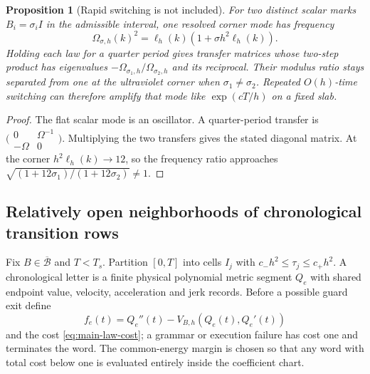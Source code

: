 \documentclass[11pt]{article}
\newtheorem{proposition}[proposition]{Proposition}
\theoremstyle{definition}
\theoremstyle{remark}
\begin{document}
\begin{proposition}[Rapid switching is not included]
\label{prop:supp-law-switching}
For two distinct scalar marks $B_i=\sigma_iI$ in the admissible interval, one
resolved corner mode has frequency
\begin{equation}
 \Omega_{\sigma,h}(k)^2=\ell_h(k)(1+\sigma h^2\ell_h(k)).
 \label{eq:supp-law-dispersion}
\end{equation}
Holding each law for a quarter period gives transfer matrices whose two-step
product has eigenvalues
$-\Omega_{\sigma_1,h}/\Omega_{\sigma_2,h}$ and its reciprocal.  Their modulus
ratio stays separated from one at the ultraviolet corner when
$\sigma_1\ne\sigma_2$.  Repeated $O(h)$-time switching can therefore amplify
that mode like $\exp(cT/h)$ on a fixed slab.
\end{proposition}
\begin{proof}
The flat scalar mode is an oscillator.  A quarter-period transfer is
$\bigl(\begin{smallmatrix}0&\Omega^{-1}\\-\Omega&0\end{smallmatrix}\bigr)$.
Multiplying the two transfers gives the stated diagonal matrix.  At the
corner $h^2\ell_h(k)\to12$, so the frequency ratio approaches
$\sqrt{(1+12\sigma_1)/(1+12\sigma_2)}\ne1$.
\end{proof}

\subsection{Relatively open neighborhoods of chronological transition rows}

Fix $B\in\overline{\mathcal B}$ and $T<T_s$.  Partition $[0,T]$ into cells
$I_j$ with $c_-h^2\le\tau_j\le c_+h^2$.  A chronological letter is a finite
physical polynomial metric segment $Q_e$ with shared endpoint value,
velocity, acceleration and jerk records.  Before a possible guard exit define
\begin{equation}
 f_e(t)=Q_e''(t)-V_{B,h}(Q_e(t),Q_e'(t))
 \label{eq:supp-law-residual}
\end{equation}
and the cost \eqref{eq:main-law-cost}; a grammar or execution failure has cost
one and terminates the word.  The common-energy margin is chosen so that any
word with total cost below one is evaluated entirely inside the coefficient
chart.
\end{document}
